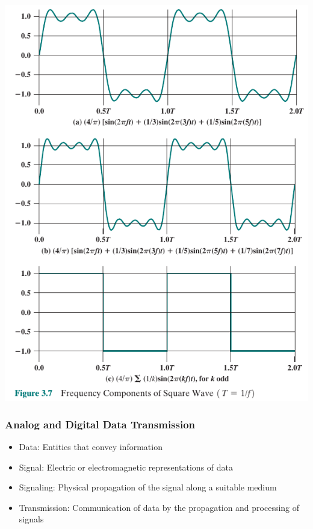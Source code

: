 \documentclass[pdflatex,compress]{beamer}
\begin{document}
\begin{frame}
	\begin{center}
		\includegraphics[height=0.8\textheight]{img/img07}
	\end{center}
\end{frame}

\begin{frame}
	\frametitle{Analog and Digital Data Transmission}
	\begin{itemize}
		\item Data: Entities that convey information
		\item Signal: Electric or electromagnetic representations of data
		\item Signaling: Physical propagation of the signal along a suitable medium
		\item Transmission: Communication of data by the propagation and processing of signals
	\end{itemize}
\end{frame}
\end{document}
